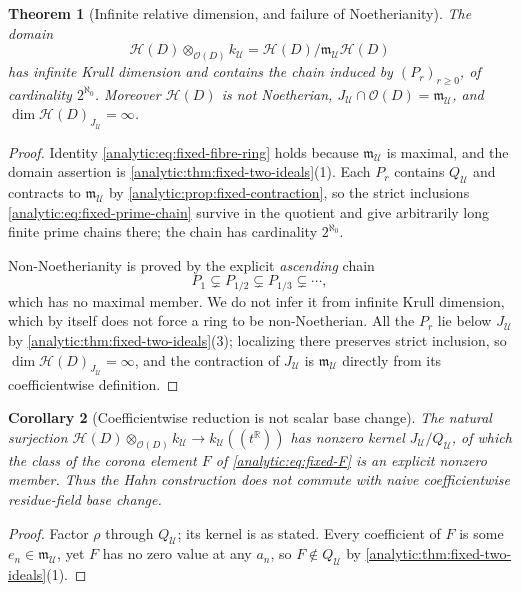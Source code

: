 \documentclass[11pt,letterpaper]{article}
\newtheorem{theorem}{Theorem}[section]
\newtheorem{corollary}[theorem]{Corollary}
\theoremstyle{definition}
\theoremstyle{remark}
\newcommand{\R}{\mathbb R}
\newcommand{\HH}{\mathcal H}
\newcommand{\UU}{\mathcal U}
\newcommand{\m}{\mathfrak m}
\newcommand{\OO}{\mathcal O}
\numberwithin{equation}{section}
\begin{document}
\begin{theorem}[Infinite relative dimension, and failure of Noetherianity]
\label{analytic:thm:fixed-fibre}
The domain
\begin{equation}\label{analytic:eq:fixed-fibre-ring}
 \HH(D)\otimes_{\OO(D)}k_\UU=\HH(D)/\m_\UU\HH(D)
\end{equation}
has infinite Krull dimension and contains the chain induced by
$(P_r)_{r\ge0}$, of cardinality $2^{\aleph_0}$. Moreover $\HH(D)$ is
\emph{not} Noetherian,
$J_\UU\cap\OO(D)=\m_\UU$, and $\dim\HH(D)_{J_\UU}=\infty$.
\end{theorem}
\begin{proof}
Identity \eqref{analytic:eq:fixed-fibre-ring} holds because $\m_\UU$ is
maximal, and the domain assertion is
\cref{analytic:thm:fixed-two-ideals}(1). Each $P_r$ contains $Q_\UU$ and
contracts to $\m_\UU$ by \cref{analytic:prop:fixed-contraction}, so the
strict inclusions \eqref{analytic:eq:fixed-prime-chain} survive in the
quotient and give arbitrarily long finite prime chains there; the chain has
cardinality $2^{\aleph_0}$.

Non-Noetherianity is proved by the explicit \emph{ascending} chain
\[
 P_1\subsetneq P_{1/2}\subsetneq P_{1/3}\subsetneq\cdots ,
\]
which has no maximal member. We do not infer it from infinite Krull
dimension, which by itself does not force a ring to be non-Noetherian.
All the $P_r$ lie below $J_\UU$ by
\cref{analytic:thm:fixed-two-ideals}(3); localizing there preserves strict
inclusion, so $\dim\HH(D)_{J_\UU}=\infty$, and the contraction of $J_\UU$
is $\m_\UU$ directly from its coefficientwise definition.
\end{proof}

\begin{corollary}[Coefficientwise reduction is not scalar base change]
\label{analytic:cor:fixed-basechange}
The natural surjection
$\HH(D)\otimes_{\OO(D)}k_\UU\to k_\UU((t^\R))$ has nonzero kernel
$J_\UU/Q_\UU$, of which the class of the corona element $F$ of
\eqref{analytic:eq:fixed-F} is an explicit nonzero member. Thus the Hahn
construction does not commute with naive coefficientwise residue-field base
change.
\end{corollary}
\begin{proof}
Factor $\rho$ through $Q_\UU$; its kernel is as stated. Every coefficient
of $F$ is some $e_n\in\m_\UU$, yet $F$ has no zero value at any $a_n$, so
$F\notin Q_\UU$ by \cref{analytic:thm:fixed-two-ideals}(1).
\end{proof}
\end{document}

